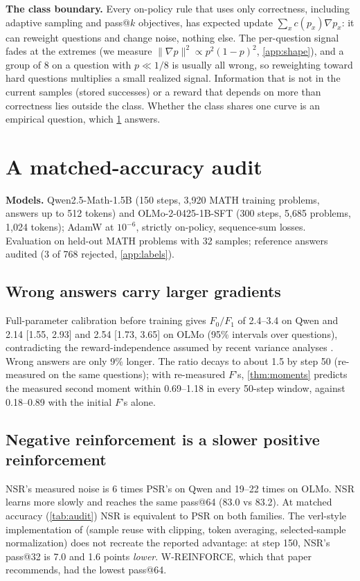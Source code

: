 \documentclass{article}
\theoremstyle{plain}
\theoremstyle{remark}
\begin{document}
\textbf{The class boundary.} Every on-policy rule that uses only correctness, including adaptive sampling and pass@$k$ objectives, has expected update $\sum_x c(p_x)\nabla p_x$: it can reweight questions and change noise, nothing else. The per-question signal fades at the extremes (we measure $\|\nabla p\|^2\propto p^2(1-p)^2$, \cref{app:shape}), and a group of 8 on a question with $p\ll1/8$ is usually all wrong, so reweighting toward hard questions multiplies a small realized signal. Information that is not in the current samples (stored successes) or a reward that depends on more than correctness lies outside the class. Whether the class shares one curve is an empirical question, which \cref{sec:audit} answers.

\section{A matched-accuracy audit}\label{sec:audit}
\textbf{Models.} Qwen2.5-Math-1.5B \citep{yang2024qwen25math} (150 steps, 3,920 MATH training problems, answers up to 512 tokens) and OLMo-2-0425-1B-SFT \citep{olmo2024} (300 steps, 5,685 problems, 1,024 tokens); AdamW at $10^{-6}$, strictly on-policy, sequence-sum losses. Evaluation on held-out MATH problems \citep{hendrycks2021math} with 32 samples; reference answers audited (3 of 768 rejected, \cref{app:labels}).

\subsection{Wrong answers carry larger gradients}\label{sec:asym}
Full-parameter calibration before training gives $F_0/F_1$ of 2.4--3.4 on Qwen and 2.14 [1.55, 2.93] and 2.54 [1.73, 3.65] on OLMo (95\% intervals over questions), contradicting the reward-independence assumed by recent variance analyses \citep{wang2026vsr}. Wrong answers are only 9\% longer. The ratio decays to about 1.5 by step 50 (re-measured on the same questions); with re-measured $F$'s, \cref{thm:moments} predicts the measured second moment within 0.69--1.18 in every 50-step window, against 0.18--0.89 with the initial $F$'s alone.

\subsection{Negative reinforcement is a slower positive reinforcement}
NSR's measured noise is 6 times PSR's on Qwen and 19--22 times on OLMo. NSR learns more slowly and reaches the same pass@64 (83.0 vs 83.2). At matched accuracy (\cref{tab:audit}) NSR is equivalent to PSR on both families. The verl-style implementation of \citet{zhu2025nsr} (sample reuse with clipping, token averaging, selected-sample normalization) does not recreate the reported advantage: at step 150, NSR's pass@32 is 7.0 and 1.6 points \emph{lower}. W-REINFORCE, which that paper recommends, had the lowest pass@64.
\end{document}
